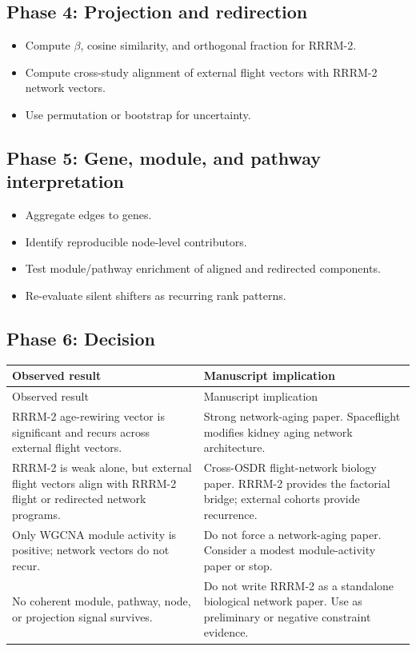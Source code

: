 \documentclass[11pt]{article}
\begin{document}
\subsection*{Phase 4: Projection and redirection}

\begin{itemize}
  \item Compute $\beta$, cosine similarity, and orthogonal fraction for RRRM-2.
  \item Compute cross-study alignment of external flight vectors with RRRM-2
        network vectors.
  \item Use permutation or bootstrap for uncertainty.
\end{itemize}

\subsection*{Phase 5: Gene, module, and pathway interpretation}

\begin{itemize}
  \item Aggregate edges to genes.
  \item Identify reproducible node-level contributors.
  \item Test module/pathway enrichment of aligned and redirected components.
  \item Re-evaluate silent shifters as recurring rank patterns.
\end{itemize}

\subsection*{Phase 6: Decision}

\begin{longtable}{p{}p{}}
\toprule
Observed result & Manuscript implication \\
\midrule
\endfirsthead
\toprule
Observed result & Manuscript implication \\
\midrule
\endhead
RRRM-2 age-rewiring vector is significant and recurs across external flight
vectors. &
Strong network-aging paper. Spaceflight modifies kidney aging network
architecture. \\
\addlinespace
RRRM-2 is weak alone, but external flight vectors align with RRRM-2 flight or
redirected network programs. &
Cross-OSDR flight-network biology paper. RRRM-2 provides the factorial bridge;
external cohorts provide recurrence. \\
\addlinespace
Only WGCNA module activity is positive; network vectors do not recur. &
Do not force a network-aging paper. Consider a modest module-activity paper or
stop. \\
\addlinespace
No coherent module, pathway, node, or projection signal survives. &
Do not write RRRM-2 as a standalone biological network paper. Use as preliminary
or negative constraint evidence. \\
\bottomrule
\end{longtable}
\end{document}
